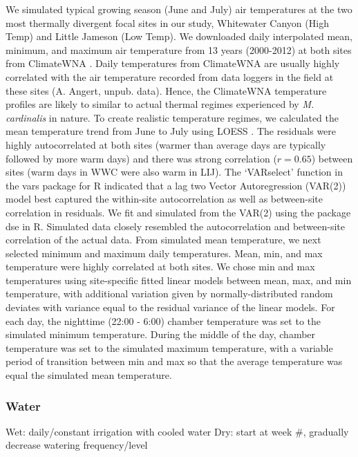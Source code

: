 \documentclass[11pt, oneside]{article}\usepackage[]{graphicx}\usepackage[]{color}
\newcommand{\pkg}[1]{{\fontseries{b}\selectfont #1}}
\begin{document}
We simulated typical growing season (June and July) air temperatures at the two most thermally divergent focal sites in our study, Whitewater Canyon (High Temp) and Little Jameson (Low Temp). We downloaded daily interpolated mean, minimum, and maximum air temperature from 13 years (2000-2012) at both sites from ClimateWNA \citep{Wang_etal_2012}. Daily temperatures from ClimateWNA are usually highly correlated with the air temperature recorded from data loggers in the field at these sites (A. Angert, unpub. data). Hence, the ClimateWNA temperature profiles are likely to similar to actual thermal regimes experienced by \textit{M. cardinalis} in nature. To create realistic temperature regimes, we calculated the mean temperature trend from June to July using LOESS \citep{Cleveland_etal_1992}. The residuals were highly autocorrelated at both sites (warmer than average days are typically followed by more warm days) and there was strong correlation ($r = 0.65$) between sites (warm days in WWC were also warm in LIJ). The `VARselect' function in the \pkg{vars} package for R \citep{Pfaff_2008} indicated that a lag two Vector Autoregression (VAR(2)) model best captured the within-site autocorrelation as well as between-site correlation in residuals. We fit and simulated from the VAR(2) using the package \pkg{dse} \citep{Gilbert_2014} in R. Simulated data closely resembled the autocorrelation and between-site correlation of the actual data. From simulated mean temperature, we next selected minimum and maximum daily temperatures. Mean, min, and max temperature were highly correlated at both sites. We chose min and max temperatures using site-specific fitted linear models between mean, max, and min temperature, with additional variation given by normally-distributed random deviates with variance equal to the residual variance of the linear models. For each day, the nighttime (22:00 - 6:00) chamber temperature was set to the simulated minimum temperature. During the middle of the day, chamber temperature was set to the simulated maximum temperature, with a variable period of transition between min and max so that the average temperature was equal the simulated mean temperature.

\subsubsection*{Water}

			Wet: daily/constant irrigation with cooled water
			Dry: start at week \#, gradually decrease watering frequency/level
\end{document}
